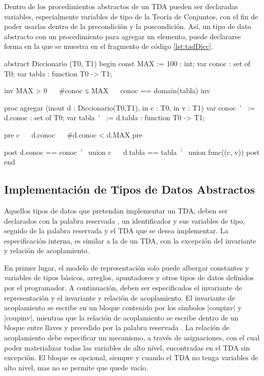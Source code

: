 Dentro de los procedimientos abstractos de un TDA pueden ser declaradas
variables, especialmente variables de tipo de la Teoría de Conjuntos, con el
fin de poder usarlas dentro de la precondición y la poscondición. Así, un tipo
de dato abstracto  con un procedimiento para agregar un
elemento, puede declararse forma en la que se muestra en el fragmento de código
\ref{lst:tadDicc}.

\begin{widegracielacode}[caption=TAD Diccionario, label=lst:tadDicc]
abstract Diccionario (T0, T1) begin
  const MAX := 100 : int;
  var   conoc      : set of T0;
  var   tabla      : function T0 -> T1;

  {inv MAX > 0 ~\Land~ #conoc ≤ MAX ~\Land~ conoc == domain(tabla) inv}

  proc agregar (inout d : Diccionario(T0,T1), in c : T0, in v : T1)
    var conoc~'~ := d.conoc : set of T0;
    var tabla~'~ := d.tabla : function T0 -> T1;

    {pre c ~\Notelem~ d.conoc ~\Land~ #d.conoc < d.MAX pre}

    {post  d.conoc == conoc~'~ union {c}
         ~\Land~ d.tabla == tabla~'~ union func({(c, v)}) post}
end
\end{widegracielacode}

\subsection{Implementación de Tipos de Datos Abstractos}

Aquellos tipos de datos que pretendan implementar un TDA, deben ser declarados
con la palabra reservada , un identificador y sus variables de
tipo, seguido de la palabra reservada  y el TDA que se
desea implementar. La especificación interna, es similar a la de un TDA, con la
excepción del invariante y relación de acoplamiento.

En primer lugar, el modelo de representación solo puede albergar constantes y
variables de tipos básicos, arreglos, apuntadores y otros tipos de datos
definidos por el programador. A continuación, deben ser especificados el
invariante de representación y el invariante y relación de acoplamiento. El
invariante de acoplamiento se escribe en un bloque contenido por los símbolos
\ingra|{coupinv| y \ingra|coupinv}|, mientras que la relación de
acoplamiento se escribe dentro de un bloque entre llaves y precedido por la
palabra reservada . La relación de acoplamiento debe especificar
un mecanismo, a través de asignaciones, con el cual poder materializar todas
las variables de alto nivel, encontradas en el TDA sin excepción. El bloque
 es opcional, siempre y cuando el TDA no tenga variables de alto
nivel, mas no se permite que quede vacío.


